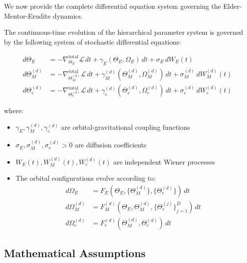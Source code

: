 We now provide the complete differential equation system governing the Elder-Mentor-Erudite dynamics.

\begin{definition}
\label{def:eme_dynamical_system}
The continuous-time evolution of the hierarchical parameter system is governed by the following system of stochastic differential equations:

\begin{align}
d\Theta_E &= -\nabla_{\Theta_E}^{\text{total}} \mathcal{L} \, dt + \gamma_E(\Theta_E, \Omega_E) \, dt + \sigma_E \, dW_E(t) \\
d\Theta_M^{(d)} &= -\nabla_{\Theta_M^{(d)}}^{\text{total}} \mathcal{L} \, dt + \gamma_M^{(d)}(\Theta_M^{(d)}, \Omega_M^{(d)}) \, dt + \sigma_M^{(d)} \, dW_M^{(d)}(t) \\
d\Theta_e^{(d)} &= -\nabla_{\Theta_e^{(d)}}^{\text{total}} \mathcal{L} \, dt + \gamma_e^{(d)}(\Theta_e^{(d)}, \Omega_e^{(d)}) \, dt + \sigma_e^{(d)} \, dW_e^{(d)}(t)
\end{align}

where:
\begin{itemize}
\item $\gamma_E, \gamma_M^{(d)}, \gamma_e^{(d)}$ are orbital-gravitational coupling functions
\item $\sigma_E, \sigma_M^{(d)}, \sigma_e^{(d)} > 0$ are diffusion coefficients
\item $W_E(t), W_M^{(d)}(t), W_e^{(d)}(t)$ are independent Wiener processes
\item The orbital configurations evolve according to:
\begin{align}
d\Omega_E &= F_E(\Theta_E, \{\Theta_M^{(d)}\}, \{\Theta_e^{(d)}\}) \, dt \\
d\Omega_M^{(d)} &= F_M^{(d)}(\Theta_E, \Theta_M^{(d)}, \{\Theta_e^{(j)}\}_{j=1}^D) \, dt \\
d\Omega_e^{(d)} &= F_e^{(d)}(\Theta_M^{(d)}, \Theta_e^{(d)}) \, dt
\end{align}
\end{itemize}
\end{definition}

\subsection{Mathematical Assumptions}

